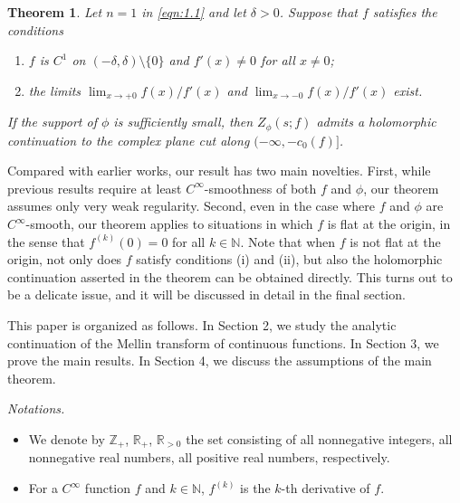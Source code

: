 \documentclass[10pt,a4paper]{amsart}
\numberwithin{equation}{section}
\newtheorem{theorem}{Theorem}[section]
\newcommand{\R}{{\mathbb R}}
\newcommand{\C}{{\mathbb C}}
\newcommand{\N}{{\mathbb N}}
\newcommand{\Z}{{\mathbb Z}}
\newcommand{\1}{{\bf 1}}
\begin{document}
\begin{theorem}\label{thm:1.2}
Let $n=1$ in \eqref{eqn:1.1}
and let $\delta>0$.
Suppose that $f$ satisfies 
the conditions
\begin{enumerate}
\item 
$f$ is $C^1$ on 
$(-\delta,\delta)\setminus\{0\}$ and 
$f'(x)\neq 0$ for all $x\neq 0$; 
\item
the limits
$
\lim_{x\to +0}f(x)/f'(x)
$
and
$
\lim_{x\to -0}f(x)/f'(x)
$
exist.
\end{enumerate}
If the support of $\phi$ is sufficiently small,
then $Z_{\phi}(s;f)$ 
admits a holomorphic continuation
to the complex plane cut along
$(-\infty,-c_0(f)]$.
\end{theorem}

Compared with earlier works, 
our result has two main novelties.
First, 
while previous results require 
at least $C^{\infty}$-smoothness 
of both $f$ and $\phi$, 
our theorem assumes only very weak regularity.
Second, 
even in the case where $f$ and $\phi$ 
are $C^{\infty}$-smooth, 
our theorem applies to situations 
in which $f$ is flat at the origin, 
in the sense that $f^{(k)}(0)=0$ 
for all $k\in\N$.
%
Note that when $f$ is not flat at the origin, 
not only does $f$ satisfy conditions (i) and (ii), 
but also 
the holomorphic continuation asserted 
in the theorem can be obtained directly.
This turns out to be a delicate issue, and 
it will be discussed in detail in the final section.


This paper is organized as follows.
In Section 2, 
we study the analytic continuation 
of the Mellin transform of continuous functions.
In Section 3, 
we prove the main results.
In Section 4, 
we discuss the assumptions of the main theorem.

\medskip

{\it Notations.}
\begin{itemize}
\item 
We denote by $\Z_+$, $\R_+$, $\R_{>0}$
the set consisting of all nonnegative integers, 
all nonnegative real numbers, all positive real numbers,  
respectively. 
\item For a $C^{\infty}$ function $f$ and $k\in\N$, 
$f^{(k)}$ is the $k$-th derivative of $f$.
\end{itemize}
\end{document}
